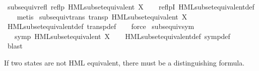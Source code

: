 \begin{isabellebody}
\isamarkupfalse%
\ subs{\isacharunderscore}{\kern0pt}equiv{\isacharunderscore}{\kern0pt}refl{\isacharcolon}{\kern0pt}\ {\isachardoublequoteopen}reflp\ {\isacharparenleft}{\kern0pt}HML{\isacharunderscore}{\kern0pt}subset{\isacharunderscore}{\kern0pt}equivalent\ X{\isacharparenright}{\kern0pt}{\isachardoublequoteclose}\isanewline
%
\isadelimproof
\ \ %
\endisadelimproof
%
\isatagproof
{}\isamarkupfalse%
\ reflpI\ HML{\isacharunderscore}{\kern0pt}subset{\isacharunderscore}{\kern0pt}equivalent{\isacharunderscore}{\kern0pt}def\isanewline
\ \ \isamarkupfalse%
\ metis%
\endisatagproof
{\isafoldproof}%
%
\isadelimproof
\isanewline
%
\endisadelimproof
\isanewline
{}\isamarkupfalse%
\ subs{\isacharunderscore}{\kern0pt}equiv{\isacharunderscore}{\kern0pt}trans{\isacharcolon}{\kern0pt}\ {\isachardoublequoteopen}transp\ {\isacharparenleft}{\kern0pt}HML{\isacharunderscore}{\kern0pt}subset{\isacharunderscore}{\kern0pt}equivalent\ X{\isacharparenright}{\kern0pt}{\isachardoublequoteclose}\isanewline
%
\isadelimproof
\ \ %
\endisadelimproof
%
\isatagproof
{}\isamarkupfalse%
\ HML{\isacharunderscore}{\kern0pt}subset{\isacharunderscore}{\kern0pt}equivalent{\isacharunderscore}{\kern0pt}def\ transp{\isacharunderscore}{\kern0pt}def\isanewline
\ \ \isamarkupfalse%
\ force%
\endisatagproof
{\isafoldproof}%
%
\isadelimproof
\isanewline
%
\endisadelimproof
\isanewline
{}\isamarkupfalse%
\ subs{\isacharunderscore}{\kern0pt}equiv{\isacharunderscore}{\kern0pt}sym{\isacharcolon}{\kern0pt}\isanewline
\ \ \ {\isachardoublequoteopen}symp\ {\isacharparenleft}{\kern0pt}HML{\isacharunderscore}{\kern0pt}subset{\isacharunderscore}{\kern0pt}equivalent\ X{\isacharparenright}{\kern0pt}{\isachardoublequoteclose}\isanewline
%
\isadelimproof
\ \ %
\endisadelimproof
%
\isatagproof
{}\isamarkupfalse%
\ HML{\isacharunderscore}{\kern0pt}subset{\isacharunderscore}{\kern0pt}equivalent{\isacharunderscore}{\kern0pt}def\ symp{\isacharunderscore}{\kern0pt}def\ \isanewline
\ \ \isamarkupfalse%
\ blast\isanewline
\isanewline
%
\endisatagproof
{\isafoldproof}%
%
\isadelimproof
%
\endisadelimproof
%
\isadelimvisible
%
\endisadelimvisible
%
\isatagvisible
%
\endisatagvisible
{\isafoldvisible}%
%
\isadelimvisible
%
\endisadelimvisible
%
\begin{isamarkuptext}%
If two states are not HML equivalent, there must be a distinguishing formula.%
\end{isamarkuptext}\isamarkuptrue%
\isamarkupfalse%

\end{isabellebody}
